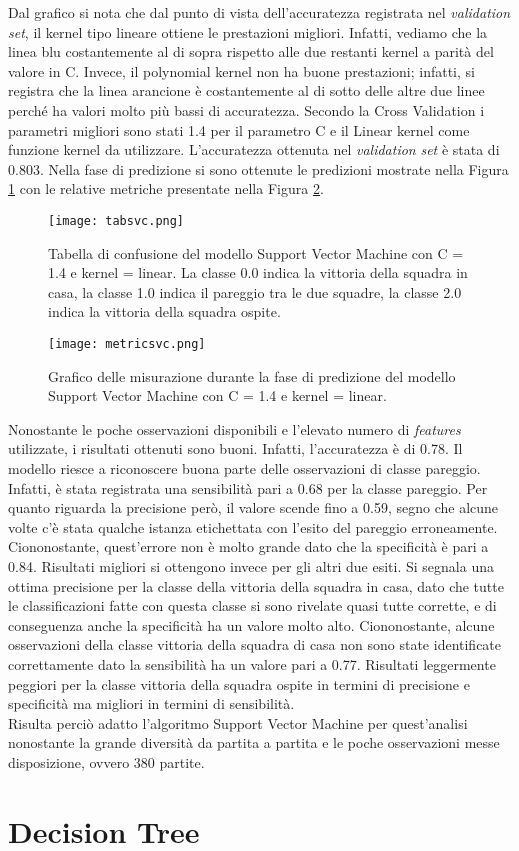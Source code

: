 Dal grafico si nota che dal punto di vista dell'accuratezza registrata nel \emph{validation} \emph{set}, il kernel tipo lineare ottiene le prestazioni migliori. Infatti, vediamo che la linea blu costantemente al di sopra rispetto alle due restanti kernel a parità del valore in C. Invece, il polynomial kernel non ha buone prestazioni; infatti, si registra che la linea arancione è costantemente al di sotto delle altre due linee perché ha valori molto più bassi di accuratezza.
Secondo la Cross Validation i parametri migliori sono stati 1.4 per il parametro C e il Linear kernel come funzione kernel da utilizzare.
L'accuratezza ottenuta nel \emph{validation} \emph{set} è stata di 0.803. Nella fase di predizione si sono ottenute le predizioni mostrate nella Figura \ref{fig:tabsvc} con le relative metriche presentate nella Figura \ref{fig:svcmetrics}.
\begin{figure}[h]
	\begin{center}
		\texttt{[image: tabsvc.png]}
		\caption{Tabella di confusione del modello Support Vector Machine con C = 1.4 e kernel = linear. La classe 0.0 indica la vittoria della squadra in casa, la classe 1.0 indica il pareggio tra le due squadre, la classe 2.0 indica la vittoria della squadra ospite.
		} 
		\label{fig:tabsvc}
	\end{center}
\end{figure}


\begin{figure}[h]
	\begin{center}
		\texttt{[image: metricsvc.png]}
		\caption{Grafico delle misurazione durante la fase di predizione del modello Support Vector Machine con C = 1.4 e kernel = linear.
		} 
		\label{fig:svcmetrics}
	\end{center}
\end{figure}
Nonostante le poche osservazioni disponibili e l'elevato numero di \emph{features} utilizzate, i risultati ottenuti sono buoni. Infatti, l'accuratezza è di 0.78. Il modello riesce a riconoscere buona parte delle osservazioni di classe pareggio. Infatti, è stata registrata una sensibilità pari a 0.68 per la classe pareggio. Per quanto riguarda la precisione però, il valore scende fino a 0.59, segno che alcune volte c'è stata qualche istanza etichettata con l'esito del pareggio erroneamente. Ciononostante, quest'errore non è molto grande dato che la specificità è pari a 0.84. Risultati migliori si ottengono invece per gli altri due esiti. Si segnala una ottima precisione per la classe della vittoria della squadra in casa, dato che tutte le classificazioni fatte con questa classe si sono rivelate quasi tutte corrette, e di conseguenza anche la specificità ha un valore molto alto. Ciononostante, alcune osservazioni della classe vittoria della squadra di casa non sono state identificate correttamente dato la sensibilità ha un valore pari a 0.77. Risultati leggermente peggiori per la classe vittoria della squadra ospite in termini di precisione e specificità ma migliori in termini di sensibilità.\\
Risulta perciò adatto l'algoritmo Support Vector Machine per quest'analisi nonostante la grande diversità da partita a partita e le poche osservazioni messe disposizione, ovvero 380 partite.

\section{Decision Tree}